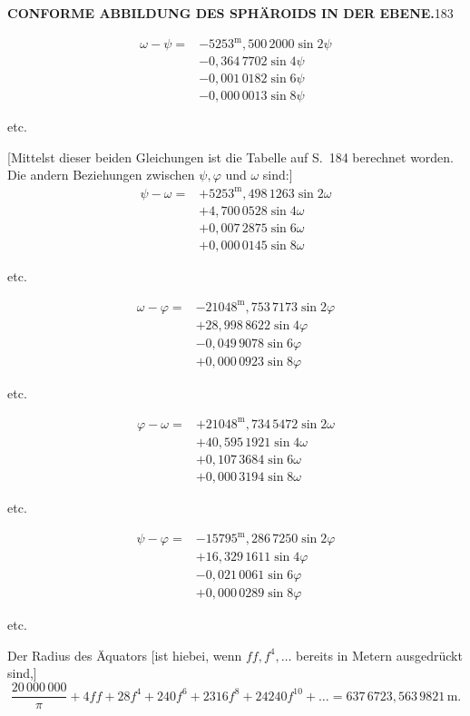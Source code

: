 \par\clearpage
\noindent\null\hfill{\small\textbf{CONFORME ABBILDUNG DES SPHÄROIDS IN DER EBENE.}}\hfill183\par\medskip
\[
\begin{aligned}
\omega-\psi={}&-5253^{\mathrm{m}}{,}500\,2000\sin2\psi\\
&-0{,}364\,7702\sin4\psi\\
&-0{,}001\,0182\sin6\psi\\
&-0{,}000\,0013\sin8\psi
\end{aligned}
\]
{\centering etc.\par}
[Mittelst dieser beiden Gleichungen ist die Tabelle auf S.~184 berechnet worden. Die andern Beziehungen zwischen \(\psi,\varphi\) und \(\omega\) sind:]
\[
\begin{aligned}
\psi-\omega={}&+5253^{\mathrm{m}}{,}498\,1263\sin2\omega\\
&+4{,}700\,0528\sin4\omega\\
&+0{,}007\,2875\sin6\omega\\
&+0{,}000\,0145\sin8\omega
\end{aligned}
\]
{\centering etc.\par}
\[
\begin{aligned}
\omega-\varphi={}&-21048^{\mathrm{m}}{,}753\,7173\sin2\varphi\\
&+28{,}998\,8622\sin4\varphi\\
&-0{,}049\,9078\sin6\varphi\\
&+0{,}000\,0923\sin8\varphi
\end{aligned}
\]
{\centering etc.\par}
\[
\begin{aligned}
\varphi-\omega={}&+21048^{\mathrm{m}}{,}734\,5472\sin2\omega\\
&+40{,}595\,1921\sin4\omega\\
&+0{,}107\,3684\sin6\omega\\
&+0{,}000\,3194\sin8\omega
\end{aligned}
\]
{\centering etc.\par}
\[
\begin{aligned}
\psi-\varphi={}&-15795^{\mathrm{m}}{,}286\,7250\sin2\varphi\\
&+16{,}329\,1611\sin4\varphi\\
&-0{,}021\,0061\sin6\varphi\\
&+0{,}000\,0289\sin8\varphi
\end{aligned}
\]
{\centering etc.\par}
Der Radius des Äquators [ist hiebei, wenn \(ff,f^4,\ldots\) bereits in Metern ausgedrückt sind,]
\[
\frac{20\,000\,000}{\pi}+4ff+28f^4+240f^6+2316f^8+24240f^{10}+\ldots
=637\,6723{,}563\,9821\,\mathrm{m}.
\]

